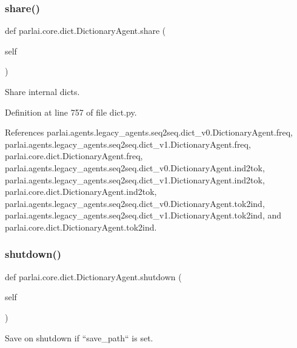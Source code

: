\subsubsection{\texorpdfstring{share()}{share()}}
{\footnotesize\ttfamily def parlai.\+core.\+dict.\+Dictionary\+Agent.\+share (\begin{DoxyParamCaption}\item[{}]{self }\end{DoxyParamCaption})}

\begin{DoxyVerb}Share internal dicts.\end{DoxyVerb}
 

Definition at line 757 of file dict.\+py.



References parlai.\+agents.\+legacy\+\_\+agents.\+seq2seq.\+dict\+\_\+v0.\+Dictionary\+Agent.\+freq, parlai.\+agents.\+legacy\+\_\+agents.\+seq2seq.\+dict\+\_\+v1.\+Dictionary\+Agent.\+freq, parlai.\+core.\+dict.\+Dictionary\+Agent.\+freq, parlai.\+agents.\+legacy\+\_\+agents.\+seq2seq.\+dict\+\_\+v0.\+Dictionary\+Agent.\+ind2tok, parlai.\+agents.\+legacy\+\_\+agents.\+seq2seq.\+dict\+\_\+v1.\+Dictionary\+Agent.\+ind2tok, parlai.\+core.\+dict.\+Dictionary\+Agent.\+ind2tok, parlai.\+agents.\+legacy\+\_\+agents.\+seq2seq.\+dict\+\_\+v0.\+Dictionary\+Agent.\+tok2ind, parlai.\+agents.\+legacy\+\_\+agents.\+seq2seq.\+dict\+\_\+v1.\+Dictionary\+Agent.\+tok2ind, and parlai.\+core.\+dict.\+Dictionary\+Agent.\+tok2ind.

\mbox{\label{classparlai_1_1core_1_1dict_1_1DictionaryAgent_aea9aca40dd1bb1976f4042565b172d88}} 
\subsubsection{\texorpdfstring{shutdown()}{shutdown()}}
{\footnotesize\ttfamily def parlai.\+core.\+dict.\+Dictionary\+Agent.\+shutdown (\begin{DoxyParamCaption}\item[{}]{self }\end{DoxyParamCaption})}

\begin{DoxyVerb}Save on shutdown if ``save_path`` is set.\end{DoxyVerb}
 

